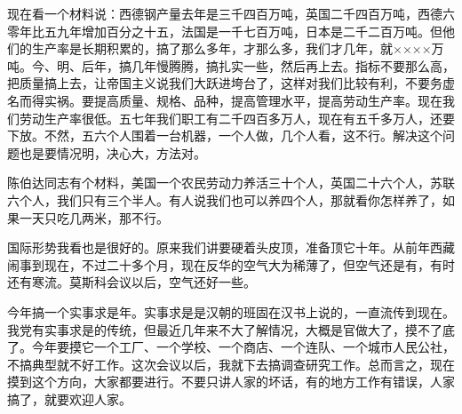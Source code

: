 现在看一个材料说：西德钢产量去年是三千四百万吨，英国二千四百万吨，西德六零年比五九年增加百分之十五，法国是一千七百万吨，日本是二千二百万吨。但他们的生产率是长期积累的，搞了那么多年，才那么多，我们才几年，就××××万吨。今、明、后年，搞几年慢腾腾，搞扎实一些，然后再上去。指标不要那么高，把质量搞上去，让帝国主义说我们大跃进垮台了，这样对我们比较有利，不要务虚名而得实祸。要提高质量、规格、品种，提高管理水平，提高劳动生产率。现在我们劳动生产率很低。五七年我们职工有二千四百多万人，现在有五千多万人，还要下放。不然，五六个人围着一台机器，一个人做，几个人看，这不行。解决这个问题也是要情况明，决心大，方法对。

陈伯达同志有个材料，美国一个农民劳动力养活三十个人，英国二十六个人，苏联六个人，我们只有三个半人。有人说我们也可以养四个人，那就看你怎样养了，如果一天只吃几两米，那不行。

国际形势我看也是很好的。原来我们讲要硬着头皮顶，准备顶它十年。从前年西藏闹事到现在，不过二十多个月，现在反华的空气大为稀薄了，但空气还是有，有时还有寒流。莫斯科会议以后，空气还好一些。

今年搞一个实事求是年。实事求是是汉朝的班固在汉书上说的，一直流传到现在。我党有实事求是的传统，但最近几年来不大了解情况，大概是官做大了，摸不了底了。今年要摸它一个工厂、一个学校、一个商店、一个连队、一个城市人民公社，不搞典型就不好工作。这次会议以后，我就下去搞调查研究工作。总而言之，现在摸到这个方向，大家都要进行。不要只讲人家的坏话，有的地方工作有错误，人家搞了，就要欢迎人家。


